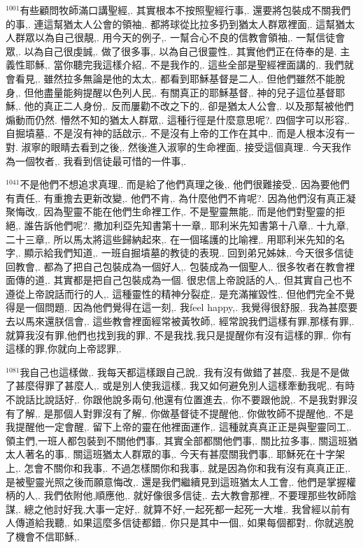 \documentclass{book}
\begin{document}
$^{1001}$有些顧問牧師滿口講聖經,.
其實根本不按照聖經行事,.
還要將包裝成不關我們的事,.
連這幫猶太人公會的領袖,.
都將球從比拉多扔到猶太人群眾裡面,.
這幫猶太人群眾以為自己很靚,.
用今天的例子,.
一幫合心不良的信教會領袖,.
一幫信徒會眾,.
以為自己很虔誠,.
做了很多事,.
以為自己很靈性,.
其實他們正在侍奉的是.
主義性耶穌,.
當你聽完我這樣介紹,.
不是我作的,.
這些全部是聖經裡面講的,.
我們就會看見,.
雖然拉多無論是他的太太,.
都看到耶穌基督是二人,.
但他們雖然不能脫身,.
但他盡量能夠提醒以色列人民,.
有關真正的耶穌基督,.
神的兒子這位基督耶穌,.
他的真正二人身份,.
反而屢勸不改之下的,.
卻是猶太人公會,.
以及那幫被他們煽動而仍然.
懵然不知的猶太人群眾,.
這種行徑是什麼意思呢?.
四個字可以形容,.
自掘墳墓,.
不是沒有神的話啟示,.
不是沒有上帝的工作在其中,.
而是人根本沒有一對.
淑寧的眼睛去看到之後,.
然後進入淑寧的生命裡面,.
接受這個真理..
今天我作為一個牧者,.
我看到信徒最可惜的一件事,.

$^{1041}$不是他們不想追求真理,.
而是給了他們真理之後,.
他們很難接受,.
因為要他們有責任,.
有重擔去更新改變,.
他們不肯,.
為什麼他們不肯呢?.
因為他們沒有真正凝聚悔改,.
因為聖靈不能在他們生命裡工作,.
不是聖靈無能,.
而是他們對聖靈的拒絕,.
誰告訴他們呢?.
撒加利亞先知書第十一章,.
耶利米先知書第十八章,.
十九章,二十三章,.
所以馬太將這些歸納起來,.
在一個瑤護的比喻裡,.
用耶利米先知的名字,.
顯示給我們知道,.
一班自掘墳墓的教徒的表現..
回到弟兄姊妹,.
今天很多信徒回教會,.
都為了把自己包裝成為一個好人,.
包裝成為一個聖人,.
很多牧者在教會裡面傳的道,.
其實都是把自己包裝成為一個.
很忠信上帝說話的人,.
但其實自己也不遵從上帝說話而行的人,.
這種靈性的精神分裂症,.
是充滿摧毀性,.
但他們完全不覺得是一個問題,.
因為他們覺得在這一刻,.
我feel happy,.
我覺得很舒服,.
我為甚麼要去以馬來還朕信會,.
這些教會裡面經常被黃牧師,.
經常說我們這樣有罪,那樣有罪,.
就算我沒有罪,他們也找到我的罪,.
不是我找,我只是提醒你有沒有這樣的罪,.
你有這樣的罪,你就向上帝認罪,.

$^{1081}$我自己也這樣做,.
我每天都這樣跟自己說,.
我有沒有做錯了甚麼,.
我是不是做了甚麼得罪了甚麼人,.
或是別人使我這樣,.
我又如何避免別人這樣牽動我呢,.
有時不說話比說話好,.
你跟他說多兩句,他還有位置進去,.
你不要跟他說,.
不是我對罪沒有了解,.
是那個人對罪沒有了解,.
你做基督徒不提醒他,.
你做牧師不提醒他,.
不是我提醒他一定會醒,.
留下上帝的靈在他裡面運作,.
這種就真真正正是與聖靈同工,.
領主們,一班人都包裝到不關他們事,.
其實全部都關他們事,.
關比拉多事,.
關這班猶太人著名的事,.
關這班猶太人群眾的事,.
今天有甚麼關我們事,.
耶穌死在十字架上,.
怎會不關你和我事,.
不過怎樣關你和我事,.
就是因為你和我有沒有真真正正,.
是被聖靈光照之後而願意悔改,.
還是我們繼續見到這班猶太人工會,.
他們是掌握權柄的人,.
我們依附他,順應他,.
就好像很多信徒,.
去大教會那裡,.
不要理那些牧師陰謀,.
總之他討好我,大事一定好,.
就算不好,一起死都一起死一大堆,.
我曾經以前有人傳道給我聽,.
如果這麼多信徒都錯,.
你只是其中一個,.
如果每個都對,.
你就逃脫了機會不信耶穌,.
\end{document}
